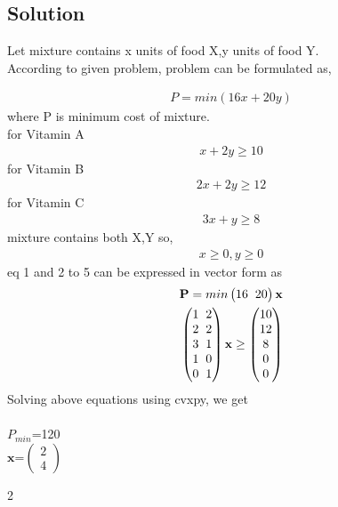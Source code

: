 \documentclass{article}
\newcommand{\myvec}[1]{\ensuremath{\begin{pmatrix}#1\end{pmatrix}}}
\let\vec\mathbf
\begin{document}
\begin{multicols}{2}
\section*{Solution}
\begin{flushleft}
Let mixture contains x units of food X,y units of food Y.\\
According to given problem, problem can be formulated as,\\
\end{flushleft}
\begin{align}
P=min(16x+20y)
\end{align}
where P is minimum cost of mixture.\\
for Vitamin A
\begin{align}
x+2y \geq10
\end{align}
for Vitamin B
\begin{align}
2x+2y \geq 12
\end{align}
for Vitamin C
\begin{align}
3x+y \geq 8
\end{align}
mixture contains both X,Y so,
\begin{align}
x\geq0,y\geq0
\end{align}
eq 1 and 2 to 5 can be expressed in vector form as
\begin{align*}
\vec{P}=min\myvec{16 \hspace{0.2cm}20}\vec{x}\\
\myvec{1 \hspace{0.2cm} 2\\
       2 \hspace{0.2cm} 2\\
       3 \hspace{0.2cm} 1\\
       1 \hspace{0.2cm}0\\
       0 \hspace{0.2cm} 1}\vec{x}\geq \myvec{10 \\12\\8\\0\\0}
\end{align*}
Solving above equations using cvxpy, we get\\
\vspace{0.1cm}\\
$P_{min}$=120\\
$\vec{x}$=$\myvec{2\\4}$
\end{multicols}{2}
\end{document}
